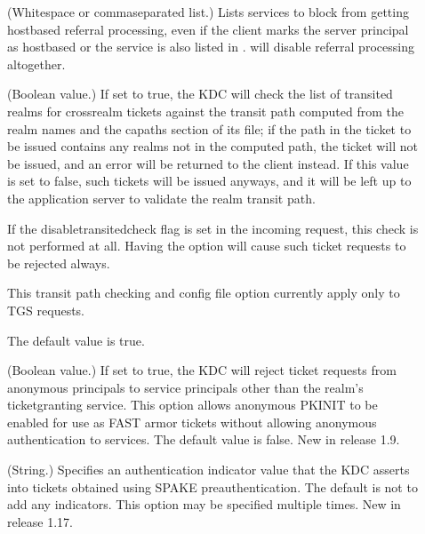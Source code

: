 \documentclass[letterpaper,10pt,english]{sphinxmanual}
\begin{document}
\begin{description}
\item[{}] \leavevmode
\sphinxAtStartPar
(Whitespace\sphinxhyphen{} or comma\sphinxhyphen{}separated list.)  Lists services to block
from getting host\sphinxhyphen{}based referral processing, even if the client
marks the server principal as host\sphinxhyphen{}based or the service is also
listed in .   will
disable referral processing altogether.

\item[{}] \leavevmode
\sphinxAtStartPar
(Boolean value.)  If set to true, the KDC will check the list of
transited realms for cross\sphinxhyphen{}realm tickets against the transit path
computed from the realm names and the capaths section of its
{\hyperref[\detokenize{admin/conf_files/krb5_conf:krb5-conf-5}]{}} file; if the path in the ticket to be issued
contains any realms not in the computed path, the ticket will not
be issued, and an error will be returned to the client instead.
If this value is set to false, such tickets will be issued
anyways, and it will be left up to the application server to
validate the realm transit path.

\sphinxAtStartPar
If the disable\sphinxhyphen{}transited\sphinxhyphen{}check flag is set in the incoming
request, this check is not performed at all.  Having the
 option will cause such ticket requests to
be rejected always.

\sphinxAtStartPar
This transit path checking and config file option currently apply
only to TGS requests.

\sphinxAtStartPar
The default value is true.

\item[{}] \leavevmode
\sphinxAtStartPar
(Boolean value.)  If set to true, the KDC will reject ticket
requests from anonymous principals to service principals other
than the realm’s ticket\sphinxhyphen{}granting service.  This option allows
anonymous PKINIT to be enabled for use as FAST armor tickets
without allowing anonymous authentication to services.  The
default value is false.  New in release 1.9.

\item[{}] \leavevmode
\sphinxAtStartPar
(String.)  Specifies an authentication indicator value that the
KDC asserts into tickets obtained using SPAKE pre\sphinxhyphen{}authentication.
The default is not to add any indicators.  This option may be
specified multiple times.  New in release 1.17.


\end{description}
\end{document}
